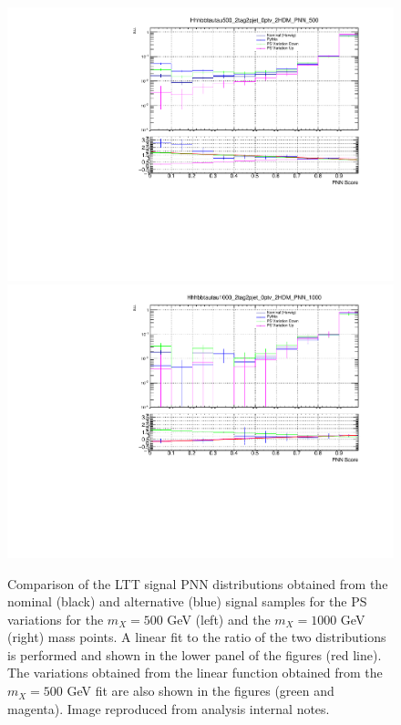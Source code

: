 \begin{figure}
\centering
\includegraphics[width=.49\textwidth]{figures/systs/LepHad_Signal_LTT_500_psSysts_PNN_Fit_Logy.pdf}
\includegraphics[width=.49\textwidth]{figures/systs/LepHad_Signal_LTT_1000_psSysts_PNN_Fit_Logy.pdf}
\caption{Comparison of the LTT signal PNN distributions 
obtained from the nominal (black) and alternative (blue) 
signal samples for the PS variations for the  $m_X= 500$ GeV (left) 
and the $m_X=1000$ GeV (right) mass points. 
A linear fit to the ratio of the two distributions is performed and 
shown in the lower panel of the figures (red line). 
The variations obtained from the linear function obtained from the $m_X= 500$ 
GeV fit are also shown in the figures (green and magenta).
Image reproduced from analysis internal notes.}
\label{fig:LepHadLTTSignalSysts}
\end{figure}




